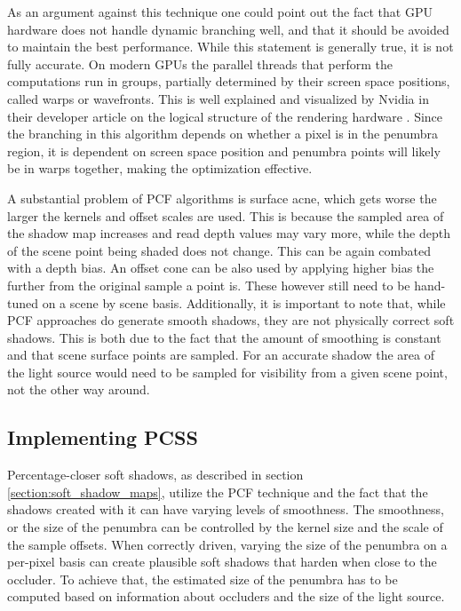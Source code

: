 As an argument against this technique one could point out the fact that GPU hardware does not handle dynamic branching well, and that it should be avoided to maintain the best performance. While this statement is generally true, it is not fully accurate. On modern GPUs the parallel threads that perform the computations run in groups, partially determined by their screen space positions, called warps or wavefronts. This is well explained and visualized by Nvidia in their developer article on the logical structure of the rendering hardware \cite{bib:internet:nvidia_traingle_life}. Since the branching in this algorithm depends on whether a pixel is in the penumbra region, it is dependent on screen space position and penumbra points will likely be in warps together, making the optimization effective.

A substantial problem of PCF algorithms is surface acne, which gets worse the larger the kernels and offset scales are used. This is because the sampled area of the shadow map increases and read depth values may vary more, while the depth of the scene point being shaded does not change. This can be again combated with a depth bias. An offset cone can be also used by applying higher bias the further from the original sample a point is. These however still need to be hand-tuned on a scene by scene basis. Additionally, it is important to note that, while PCF approaches do generate smooth shadows, they are not physically correct soft shadows. This is both due to the fact that the amount of smoothing is constant and that scene surface points are sampled. For an accurate shadow the area of the light source would need to be sampled for visibility from a given scene point, not the other way around.

\subsection{Implementing PCSS}
\label{section:pcss}
Percentage-closer soft shadows, as described in section \ref{section:soft_shadow_maps}, utilize the PCF technique and the fact that the shadows created with it can have varying levels of smoothness. The smoothness, or the size of the penumbra can be controlled by the kernel size and the scale of the sample offsets. When correctly driven, varying the size of the penumbra on a per-pixel basis can create plausible soft shadows that harden when close to the occluder. To achieve that, the estimated size of the penumbra has to be computed based on information about occluders and the size of the light source.

